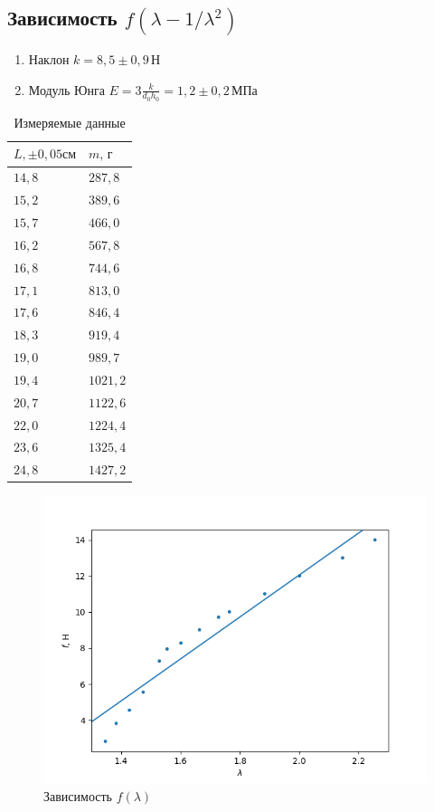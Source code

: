 \documentclass[a4paper, 12pt]{article}
\begin{document}
    \subsection{Зависимость $f(\lambda-1/\lambda^2)$}
    \begin{enumerate}
        \item Наклон $k=8{,}5\pm 0{,}9\,\text{Н}$
        \item Модуль Юнга $E=3\frac{k}{d_0h_0}=1{,}2\pm 0{,}2\,\text{МПа}$
    \end{enumerate}

    \begin{table}[ht!]
        \caption{Измеряемые данные}
        \begin{tabular}{|l|l|}
        \hline
        $L,\pm0{,}05\text{см}$ & $m,\,\text{г}$ \\ \hline
        $14{,}8$               & $287{,}8$    \\ \hline
        $15{,}2$               & $389{,}6$    \\ \hline
        $15{,}7$               & $466{,}0$    \\ \hline
        $16{,}2$               & $567{,}8$    \\ \hline
        $16{,}8$               & $744{,}6$    \\ \hline
        $17{,}1$               & $813{,}0$    \\ \hline
        $17{,}6$               & $846{,}4$    \\ \hline
        $18{,}3$               & $919{,}4$    \\ \hline
        $19{,}0$               & $989{,}7$    \\ \hline
        $19{,}4$               & $1021{,}2$   \\ \hline
        $20{,}7$               & $1122{,}6$   \\ \hline
        $22{,}0$               & $1224{,}4$   \\ \hline
        $23{,}6$               & $1325{,}4$   \\ \hline
        $24{,}8$               & $1427{,}2$   \\ \hline
        \end{tabular}
    \end{table}

    \begin{figure}
        \centering\includegraphics[width=0.8\linewidth]{img/lol.png}
        \caption{Зависимость $f(\lambda)$}
    \end{figure}
\end{document}
